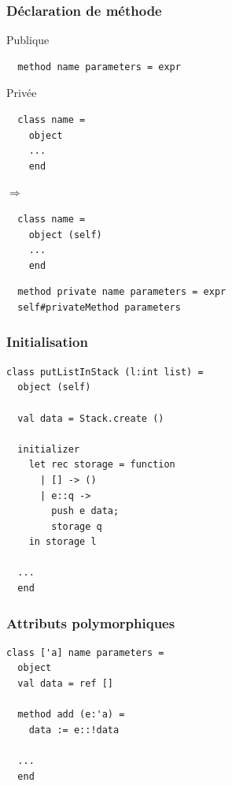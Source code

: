 \begin{frame}[fragile]
	\frametitle{Déclaration de méthode}
	\begin{block}{Publique}
		\begin{lstlisting}
  method name parameters = expr
		\end{lstlisting}
	\end{block}
	\begin{block}{Privée}
		\begin{minipage}{0.4\textwidth}
  			\begin{lstlisting}
  class name =
    object
    ...
    end
			\end{lstlisting}
		\end{minipage}$\Rightarrow$
		\begin{minipage}{0.4\textwidth}
			\begin{lstlisting}
  class name =
    object (self)
    ...
    end
			\end{lstlisting}
		\end{minipage}
	\end{block}
	\begin{lstlisting}
  method private name parameters = expr
  self#privateMethod parameters
	\end{lstlisting}
\end{frame}

\begin{frame}[fragile]
	\frametitle{Initialisation}
	\begin{lstlisting}
class putListInStack (l:int list) =
  object (self)

  val data = Stack.create ()

  initializer
    let rec storage = function
      | [] -> ()
      | e::q ->
        push e data;
        storage q
    in storage l

  ...
  end
	\end{lstlisting}
\end{frame}

\begin{frame}[fragile]
	\frametitle{Attributs polymorphiques}
	\begin{lstlisting}
class ['a] name parameters =
  object
  val data = ref []

  method add (e:'a) =
    data := e::!data

  ...
  end
	\end{lstlisting}
\end{frame}

